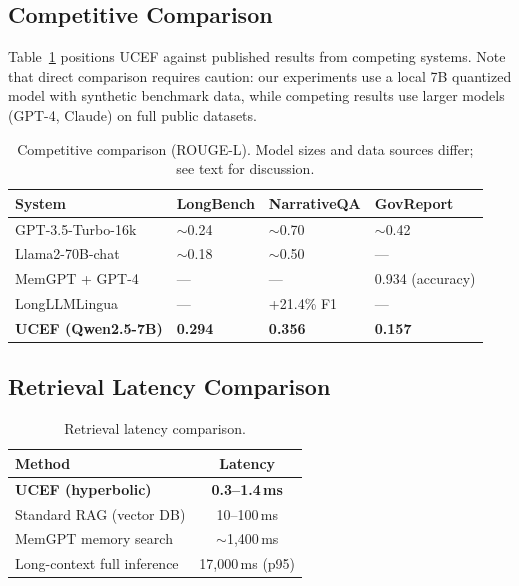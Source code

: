 \documentclass[11pt,a4paper]{article}
\newcommand{\ucef}{\textsf{UCEF}}
\begin{document}
\subsection{Competitive Comparison}

Table~\ref{tab:competitive} positions \ucef{} against published results
from competing systems.  Note that direct comparison requires caution: our
experiments use a local 7B quantized model with synthetic benchmark data,
while competing results use larger models (GPT-4, Claude) on full public
datasets.

\begin{table}[t]
\caption{Competitive comparison (ROUGE-L).  Model sizes and data sources
  differ; see text for discussion.}
\label{tab:competitive}
\centering
\small
\begin{tabular}{@{}llll@{}}
\toprule
System & LongBench & NarrativeQA & GovReport \\
\midrule
GPT-3.5-Turbo-16k & $\sim$0.24 & $\sim$0.70 & $\sim$0.42 \\
Llama2-70B-chat & $\sim$0.18 & $\sim$0.50 & --- \\
MemGPT + GPT-4 & --- & --- & 0.934 (accuracy) \\
LongLLMLingua & --- & +21.4\% F1 & --- \\
\textbf{\ucef{} (Qwen2.5-7B)} & \textbf{0.294} & \textbf{0.356} & \textbf{0.157} \\
\bottomrule
\end{tabular}
\end{table}

\subsection{Retrieval Latency Comparison}

\begin{table}[t]
\caption{Retrieval latency comparison.}
\label{tab:latency}
\centering
\small
\begin{tabular}{@{}lc@{}}
\toprule
Method & Latency \\
\midrule
\textbf{\ucef{} (hyperbolic)} & \textbf{0.3--1.4\,ms} \\
Standard RAG (vector DB) & 10--100\,ms \\
MemGPT memory search & $\sim$1,400\,ms \\
Long-context full inference & 17,000\,ms (p95) \\
\bottomrule
\end{tabular}
\end{table}
\end{document}

